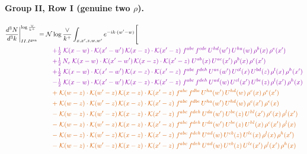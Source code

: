 \documentclass[10pt]{article}
\numberwithin{equation}{section}
\newcommand{\NNv}{\mathcal N\log\frac{\vee}{k^+}}
\begin{document}
\paragraph{Group II, Row I (genuine two $\rho$).}
\begin{align}
\frac{d^3N}{d^3k}\bigg|^{\log\frac{\vee}{k^+}}_{II.I^{\rm gen}}={}&\NNv\int_{x,x',z,w,w'}e^{-ik\cdot(w'-w)}\Bigg[\notag\\
&\quad{\color{CC}+\tfrac{1}{2}\;\mathcal{K}(x-w)\cdot\mathcal{K}(x'-w')\,\mathcal{K}(x-z)\cdot\mathcal{K}(x'-z)\;f^{abc}\,f^{cde}\,U^{hd}(w')\,U^{ha}(w)\,\rho^{b}(x)\,\rho^{e}(x')}\notag\\
&\quad{\color{CC}+\tfrac{1}{2}\,N_c\;\mathcal{K}(x-w)\cdot\mathcal{K}(x'-w')\,\mathcal{K}(x-z)\cdot\mathcal{K}(x'-z)\;U^{ab}(x)\,U^{ac}(x')\,\rho^{b}(x)\,\rho^{c}(x')}\notag\\
&\quad{\color{CC}+\tfrac{1}{2}\;\mathcal{K}(x-w)\cdot\mathcal{K}(x'-w')\,\mathcal{K}(x-z)\cdot\mathcal{K}(x'-z)\;f^{abc}\,f^{deh}\,U^{ae}(w')\,U^{cl}(x)\,U^{bd}(z)\,\rho^{l}(x)\,\rho^{h}(x')}\notag\\
&\quad{\color{CC}-\tfrac{1}{2}\;\mathcal{K}(x-w)\cdot\mathcal{K}(x'-w')\,\mathcal{K}(x-z)\cdot\mathcal{K}(x'-z)\;f^{abc}\,f^{deh}\,U^{ad}(w)\,U^{cl}(x')\,U^{be}(z)\,\rho^{l}(x')\,\rho^{h}(x)}\notag\\
&\quad{\color{BFK}+\;\mathcal{K}(w-z)\cdot\mathcal{K}(w'-z)\,\mathcal{K}(x-z)\cdot\mathcal{K}(x'-z)\;f^{abc}\,f^{dbe}\,U^{ha}(w')\,U^{hd}(w)\,\rho^{c}(x)\,\rho^{e}(x')}\notag\\
&\quad{\color{BFK}+\;\mathcal{K}(w-z)\cdot\mathcal{K}(w'-z)\,\mathcal{K}(x-z)\cdot\mathcal{K}(x'-z)\;f^{abc}\,f^{dbe}\,U^{ha}(w')\,U^{hd}(w)\,\rho^{c}(x')\,\rho^{e}(x)}\notag\\
&\quad{\color{BFK}-\;\mathcal{K}(w-z)\cdot\mathcal{K}(w'-z)\,\mathcal{K}(x-z)\cdot\mathcal{K}(x'-z)\;f^{abc}\,f^{deh}\,U^{da}(w')\,U^{be}(z)\,U^{hl}(x')\,\rho^{c}(x)\,\rho^{l}(x')}\notag\\
&\quad{\color{BFK}-\;\mathcal{K}(w-z)\cdot\mathcal{K}(w'-z)\,\mathcal{K}(x-z)\cdot\mathcal{K}(x'-z)\;f^{abc}\,f^{deh}\,U^{da}(w')\,U^{be}(z)\,U^{hl}(x)\,\rho^{c}(x')\,\rho^{l}(x)}\notag\\
&\quad{\color{BFK}-\;\mathcal{K}(w-z)\cdot\mathcal{K}(w'-z)\,\mathcal{K}(x-z)\cdot\mathcal{K}(x'-z)\;f^{abc}\,f^{deh}\,U^{ad}(w)\,U^{eb}(z)\,U^{lc}(x)\,\rho^{l}(x)\,\rho^{h}(x')}\notag\\
&\quad{\color{BFK}-\;\mathcal{K}(w-z)\cdot\mathcal{K}(w'-z)\,\mathcal{K}(x-z)\cdot\mathcal{K}(x'-z)\;f^{abc}\,f^{deh}\,U^{ad}(w)\,U^{eb}(z)\,U^{lc}(x')\,\rho^{l}(x')\,\rho^{h}(x)}\notag\\

\end{align}
\end{document}
